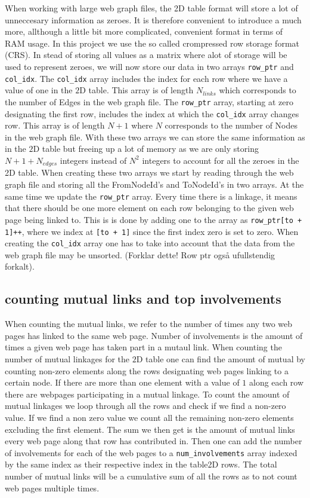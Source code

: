 \documentclass[onecolumn]{aastex62}
\begin{document}
When working with large web graph files, the 2D table format will store a lot of unneccesary information as zeroes. It is therefore convenient to introduce a much more, allthough a little bit more complicated, convenient format in terms of RAM usage. In this project we use the so called crompressed row storage format (CRS). In stead of storing all values as a matrix where alot of storage will be used to represent zeroes, we will now store our data in two arrays \texttt{row\_ptr} and \texttt{col\_idx}. The \texttt{col\_idx} array includes the index for each row where we have a value of one in the $2$D table. This array is of length $N_{links}$ which corresponds to the number of Edges in the web graph file. The \texttt{row\_ptr} array, starting at zero designating the first row, includes the index at which the \texttt{col\_idx} array changes row. This array is of length $N + 1$ where $N$ corresponds to the number of Nodes in the web graph file. With these two arrays we can store the same information as in the $2$D table but freeing up a lot of memory as we are only storing $N + 1 + N_{edges}$ integers instead of $N^2$ integers to account for all the zeroes in the 2D table. When creating these two arrays we start by reading through the web graph file and storing all the FromNodeId's and ToNodeId's in two arrays. At the same time  we update the \texttt{row\_ptr} array. Every time there is a linkage, it means that there should be one more element on each row belonging to the given web page being linked to.  This is is done by adding one to the array as \texttt{row\_ptr[to + 1]++}, where we index at \texttt{[to + 1]} since the first index zero is set to zero. When creating the \texttt{col\_idx} array one has to take into account that the data from the web graph file may be unsorted. (Forklar dette! Row ptr også ufullstendig forkalt).
\subsection{counting mutual links and top involvements}
When counting the mutual links, we refer to the number of times any two web pages has linked to the same web page. Number of involvements is the amount of times a given web page has taken part in a mutaul link. When counting the number of mutual linkages for the $2$D table one can find the amount of mutual by counting non-zero elements along the rows designating web pages linking to a certain node. If there are more than one element with a value of $1$ along each row there are webpages participating in a mutual linkage. To count the amount of mutual linkages we loop through all the rows and check if we find a non-zero value. If we find a non zero value we count all the remaining non-zero elements excluding the first element. The sum we then get is the amount of mutual links every web page along that row has contributed in. Then one can add the number of involvements for each of the web pages to a \texttt{num\_involvements} array indexed by the same index as their respective index in the table2D rows. The total number of mutual links will be a cumulative sum of all the rows as to not count web pages multiple times.\\
\end{document}
